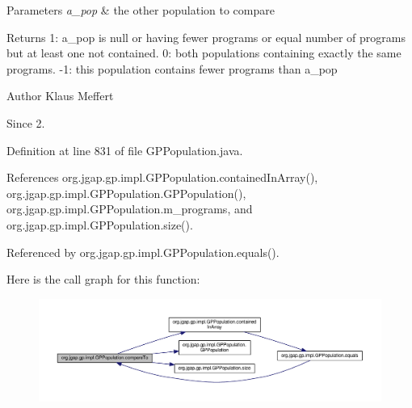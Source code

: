 \begin{DoxyParams}{Parameters}
{\em a\-\_\-pop} & the other population to compare \\
\hline
\end{DoxyParams}
\begin{DoxyReturn}{Returns}
1\-: a\-\_\-pop is null or having fewer programs or equal number of programs but at least one not contained. 0\-: both populations containing exactly the same programs. -\/1\-: this population contains fewer programs than a\-\_\-pop
\end{DoxyReturn}
\begin{DoxyAuthor}{Author}
Klaus Meffert 
\end{DoxyAuthor}
\begin{DoxySince}{Since}
2. 
\end{DoxySince}


Definition at line 831 of file G\-P\-Population.\-java.



References org.\-jgap.\-gp.\-impl.\-G\-P\-Population.\-contained\-In\-Array(), org.\-jgap.\-gp.\-impl.\-G\-P\-Population.\-G\-P\-Population(), org.\-jgap.\-gp.\-impl.\-G\-P\-Population.\-m\-\_\-programs, and org.\-jgap.\-gp.\-impl.\-G\-P\-Population.\-size().



Referenced by org.\-jgap.\-gp.\-impl.\-G\-P\-Population.\-equals().



Here is the call graph for this function\-:
\nopagebreak
\begin{figure}[H]
\begin{center}
\leavevmode
\includegraphics[width=350pt]{classorg_1_1jgap_1_1gp_1_1impl_1_1_g_p_population_a0e749981f33246815f8124532e3136c6_cgraph}
\end{center}
\end{figure}


